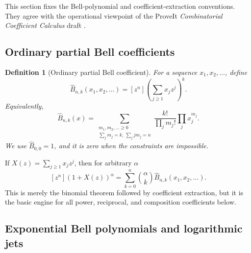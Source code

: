 \documentclass[11pt]{article}
\numberwithin{equation}{section}
\theoremstyle{mainthm}
\theoremstyle{defstyle}
\newtheorem{definition}[theorem]{Definition}
\theoremstyle{remark}
\begin{document}
This section fixes the Bell-polynomial and coefficient-extraction conventions.  They agree with the operational viewpoint of the ProveIt \emph{Combinatorial Coefficient Calculus} draft \cite{ProveItCCC}.

\subsection{Ordinary partial Bell coefficients}

\begin{definition}[Ordinary partial Bell coefficient]
For a sequence \(x_1,x_2,\ldots\), define
\begin{equation}\label{eq:ordinary-bell-def}
 \widehat B_{n,k}(x_1,x_2,\ldots)
 =[z^n]\left(\sum_{j\ge1}x_jz^j\right)^k.
\end{equation}
Equivalently,
\begin{equation}\label{eq:ordinary-bell-sum}
 \widehat B_{n,k}(x)=
 \sum_{\substack{m_1,m_2,\ldots\ge0\\
                 \sum_jm_j=k,\ \sum_jjm_j=n}}
 \frac{k!}{\prod_jm_j!}\prod_jx_j^{m_j}.
\end{equation}
We use \(\widehat B_{0,0}=1\), and it is zero when the constraints are impossible.
\end{definition}

If \(X(z)=\sum_{j\ge1}x_jz^j\), then for arbitrary \(\alpha\)
\begin{equation}\label{eq:potential-coeff}
 [z^n](1+X(z))^\alpha
 =\sum_{k=0}^{n}\binom{\alpha}{k}\widehat B_{n,k}(x_1,x_2,\ldots).
\end{equation}
This is merely the binomial theorem followed by coefficient extraction, but it is the basic engine for all power, reciprocal, and composition coefficients below.

\subsection{Exponential Bell polynomials and logarithmic jets}
\end{document}
